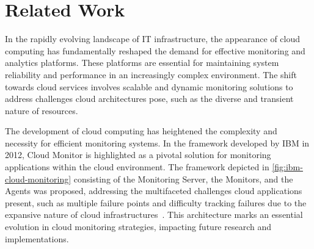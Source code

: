 
\chapter{Related Work}\label{chapter:related_work}




In the rapidly evolving landscape of IT infrastructure, the appearance of cloud computing has fundamentally reshaped the demand for effective monitoring and analytics platforms. These platforms are essential for maintaining system reliability and performance in an increasingly complex environment. The shift towards cloud services involves scalable and dynamic monitoring solutions to address challenges cloud architectures pose, such as the diverse and transient nature of resources. 

The development of cloud computing has heightened the complexity and necessity for efficient monitoring systems. In the framework developed by IBM in 2012, Cloud Monitor is highlighted as a pivotal solution for monitoring applications within the cloud environment. The framework depicted in \autoref{fig:ibm-cloud-monitoring} consisting of the Monitoring Server, the Monitors, and the Agents was proposed, addressing the multifaceted challenges cloud applications present, such as multiple failure points and difficulty tracking failures due to the expansive nature of cloud infrastructures~\parencite{anandCloudMonitorMonitoring2012}. This architecture marks an essential evolution in cloud monitoring strategies, impacting future research and implementations. 

